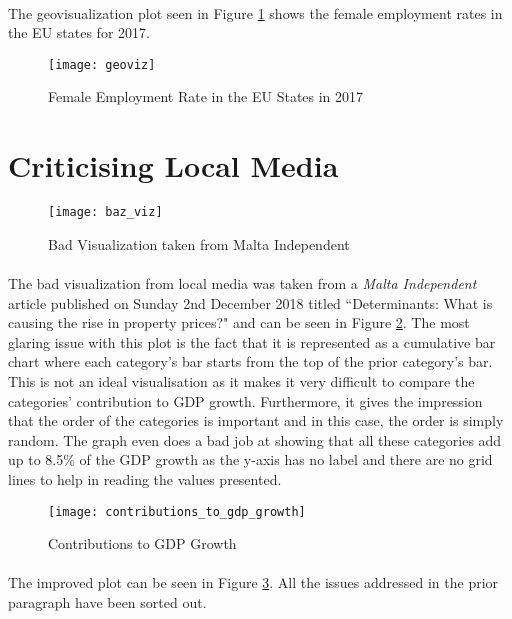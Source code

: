 \paragraph{ }The geovisualization plot seen in Figure \ref{fig::geoviz} shows the female employment rates in the EU states for 2017.
\begin{figure}[!t]
	\centering
	\texttt{[image: geoviz]}
	\caption[Female Employment Rate in the EU]{Female Employment Rate in the EU States in 2017}
	\label{fig::geoviz}
\end{figure}

\section{Criticising Local Media}
\begin{figure}[!b]
	\centering
	\texttt{[image: baz\_viz]}
	\caption[Bad Visualization]{Bad Visualization taken from Malta Independent}
	\label{fig::badviz}
\end{figure}
\paragraph{ }The bad visualization from local media was taken from a \textit{Malta Independent} article published on Sunday 2nd December 2018 titled ``Determinants: What is causing the rise in property prices?" and can be seen in Figure \ref{fig::badviz}. The most glaring issue with this plot is the fact that it is represented as a cumulative bar chart where each category's bar starts from the top of the prior category's bar. This is not an ideal visualisation as it makes it very difficult to compare the categories' contribution to GDP growth. Furthermore, it gives the impression that the order of the categories is important and in this case, the order is simply random. The graph even does a bad job at showing that all these categories add up to 8.5\% of the GDP growth as the y-axis has no label and there are no grid lines to help in reading the values presented.

\begin{figure}[!t]
	\centering
	\texttt{[image: contributions\_to\_gdp\_growth]}
	\caption[Improved Plot]{Contributions to GDP Growth}
	\label{fig::fixed}
\end{figure}

\paragraph{ }The improved plot can be seen in Figure \ref{fig::fixed}. All the issues addressed in the prior paragraph have been sorted out.  
